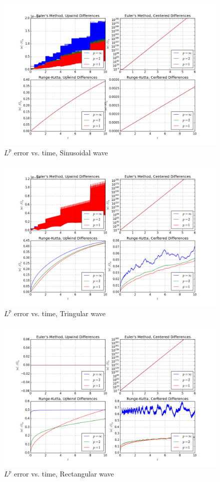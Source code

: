 \documentclass[10pt]{article}
\begin{document}
\begin{itemize}
\begin{figure}[H]
  \centering
  \caption{$L^p$ error vs. time, Sinusoidal wave}
    \includegraphics[scale=0.5]{pde_errs_case1}
\end{figure}

\begin{figure}[H]
  \centering
  \caption{$L^p$ error vs. time, Tringular wave}
    \includegraphics[scale=0.5]{pde_errs_case2}
\end{figure}

\begin{figure}[H]
  \centering
  \caption{$L^p$ error vs. time, Rectangular wave}
    \includegraphics[scale=0.5]{pde_errs_case3}
\end{figure}

\end{itemize}
\end{document}

